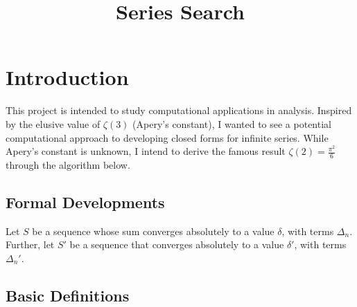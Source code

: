 \documentclass{article}
\title{Series Search}
\begin{document}
\maketitle

\section{Introduction}
This project is intended to study computational applications in analysis. 
Inspired by the elusive value of $\zeta (3)$ (Apery's constant), 
I wanted to see a potential computational approach to developing closed forms for infinite series. 
While Apery's constant is unknown, I intend to derive the famous result $\zeta (2) = \frac{{\pi}^2}{6}$ 
through the algorithm below. 

\subsection{Formal Developments}

Let $S$ be a sequence whose sum converges absolutely to a value $\delta$, with terms $\Delta_n$. 
Further, let $S'$ be a sequence that converges absolutely to a value $\delta'$, with terms $\Delta_n'$. 

\subsection{Basic Definitions} 
\end{document}
